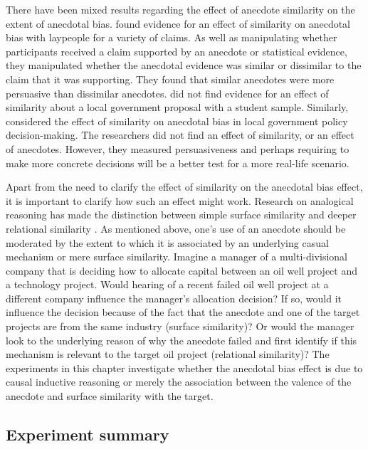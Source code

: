 \documentclass[a4paper, nobind, dvipsnames]{templates/ociamthesis}
\theoremstyle{definition}
\theoremstyle{definition}
\theoremstyle{definition}
\theoremstyle{definition}
\theoremstyle{remark}
\begin{document}
There have been mixed results regarding the effect of anecdote similarity on the
extent of anecdotal bias. \textcite[Study 3]{hoeken2009} found evidence for an effect of
similarity on anecdotal bias with laypeople for a variety of claims. As well as
manipulating whether participants received a claim supported by an anecdote or
statistical evidence, they manipulated whether the anecdotal evidence was
similar or dissimilar to the claim that it was supporting. They found that
similar anecdotes were more persuasive than dissimilar anecdotes. \textcite{hoeken2001}
did not find evidence for an effect of similarity about a local government
proposal with a student sample. Similarly, \textcite{hornikx2018} considered the effect of
similarity on anecdotal bias in local government policy decision-making. The
researchers did not find an effect of similarity, or an effect of anecdotes.
However, they measured persuasiveness and perhaps requiring to make more
concrete decisions will be a better test for a more real-life scenario.

Apart from the need to clarify the effect of similarity on the anecdotal bias
effect, it is important to clarify how such an effect might work. Research on
analogical reasoning has made the distinction between simple surface similarity
and deeper relational similarity \autocite{gentner1983}. As mentioned above, one's use
of an anecdote should be moderated by the extent to which it is associated by an
underlying casual mechanism or mere surface similarity. Imagine a manager of a
multi-divisional company that is deciding how to allocate capital between an oil
well project and a technology project. Would hearing of a recent failed oil well
project at a different company influence the manager's allocation decision? If
so, would it influence the decision because of the fact that the anecdote and
one of the target projects are from the same industry (surface similarity)? Or
would the manager look to the underlying reason of why the anecdote failed and
first identify if this mechanism is relevant to the target oil project
(relational similarity)? The experiments in this chapter investigate whether the
anecdotal bias effect is due to causal inductive reasoning or merely the
association between the valence of the anecdote and surface similarity with the
target.

\subsection{Experiment summary}
\end{document}
